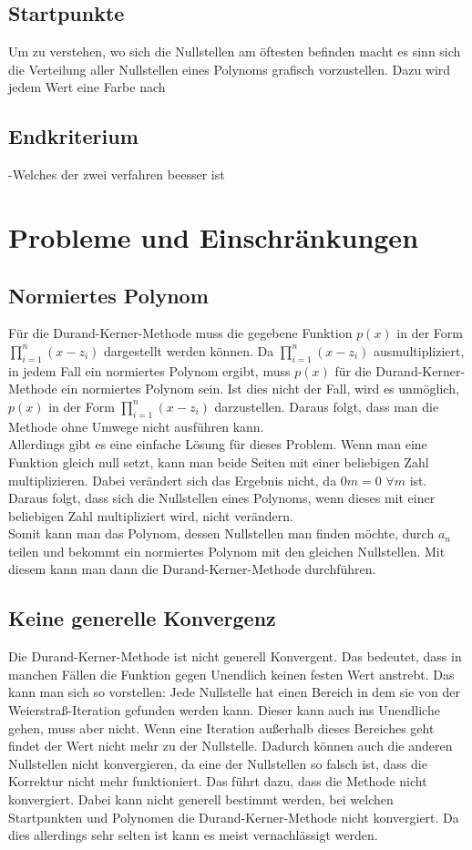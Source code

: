 \documentclass[12pt]{article}
\begin{document}
\subsection{Startpunkte}
Um zu verstehen, wo sich die Nullstellen am öftesten befinden macht es sinn sich die Verteilung aller Nullstellen eines Polynoms grafisch vorzustellen. 
Dazu wird jedem Wert eine Farbe nach

\subsection{Endkriterium}
-Welches der zwei verfahren beesser ist

\section{Probleme und Einschränkungen}
\subsection{Normiertes Polynom}
Für die Durand-Kerner-Methode muss die gegebene Funktion $p(x)$ in der Form $\prod_{i=1}^n (x-z_i)$ dargestellt werden können. Da $\prod_{i=1}^n (x-z_i)$ ausmultipliziert, in jedem Fall ein normiertes Polynom ergibt, muss $p(x)$ für die Durand-Kerner-Methode ein normiertes Polynom sein.
Ist dies nicht der Fall, wird es unmöglich, $p(x)$ in der Form $\prod_{i=1}^n (x-z_i)$ darzustellen. Daraus folgt, dass man die Methode ohne Umwege nicht ausführen kann. \\
Allerdings gibt es eine einfache Lösung für dieses Problem. Wenn man eine Funktion gleich null setzt, kann man beide Seiten mit einer beliebigen Zahl multiplizieren. Dabei verändert sich das Ergebnis nicht, da $0m = 0$ \space $\forall m$ ist. Daraus folgt, dass sich die Nullstellen eines Polynoms, wenn dieses mit einer beliebigen Zahl multipliziert wird, nicht verändern. \\
Somit kann man das Polynom, dessen Nullstellen man finden möchte, durch $a_n$ teilen und bekommt ein normiertes Polynom mit den gleichen Nullstellen. Mit diesem kann man dann die Durand-Kerner-Methode durchführen.

\subsection{Keine generelle Konvergenz}
Die Durand-Kerner-Methode ist nicht generell Konvergent. Das bedeutet, dass in manchen Fällen die Funktion gegen Unendlich keinen festen Wert anstrebt. Das kann man sich so vorstellen: Jede Nullstelle hat einen Bereich in dem sie von der Weierstraß-Iteration gefunden werden kann. Dieser kann auch ins Unendliche gehen, muss aber nicht. Wenn eine Iteration außerhalb dieses Bereiches geht findet der Wert nicht mehr zu der Nullstelle. Dadurch können auch die anderen Nullstellen nicht konvergieren, da eine der Nullstellen so falsch ist, dass die Korrektur nicht mehr funktioniert. Das führt dazu, dass die Methode nicht konvergiert. Dabei kann nicht generell bestimmt werden, bei welchen Startpunkten und Polynomen die Durand-Kerner-Methode nicht konvergiert. Da dies allerdings sehr selten ist kann es meist vernachlässigt werden.
\end{document}
